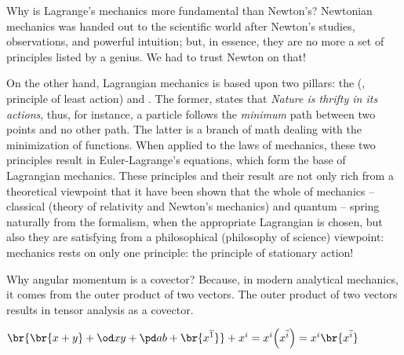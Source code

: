 \begin{note}
  Why is Lagrange's mechanics more fundamental than Newton's? Newtonian mechanics was handed out to the scientific world after Newton's studies, observations, and powerful intuition; but, in essence, they are no more a set of principles listed by a genius. We had to trust Newton on that!
  
  On the other hand, Lagrangian mechanics is based upon two pillars: the  (\aka, principle of least action) and . The former, states that \emph{Nature is thrifty in its actions}, thus, for instance, a particle follows the \emph{minimum} path between two points and no other path. The latter is a branch of math dealing with the minimization of functions. When applied to the laws of mechanics, these two principles result in Euler-Lagrange's equations, which form the base of Lagrangian mechanics. These principles and their result are not only rich from a theoretical viewpoint that it have been shown that the whole of mechanics -- classical (theory of relativity and Newton's mechanics) and quantum -- spring naturally from the formalism, when the appropriate Lagrangian is chosen, but also they are satisfying from a philosophical (philosophy of science) viewpoint: mechanics rests on only one principle: the principle of stationary action!
\end{note}

\begin{note}
  Why angular momentum is a covector? Because, in modern analytical mechanics, it comes from the outer product of two vectors. The outer product of two vectors results in tensor analysis as a covector.
\end{note}


$\br{\br{x + y} + \od xy + \pd ab + \br{\atvec\pos 1}} + \tvec\pos i = \tvec\pos i\vat{\atvec\pos i} = \tvec\pos i\br{\atvec\pos i}$
